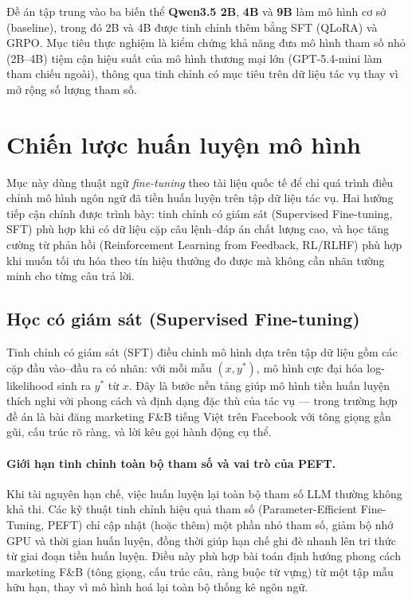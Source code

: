 Đề án tập trung vào ba biến thể \textbf{Qwen3.5 2B}, \textbf{4B} và
\textbf{9B} làm mô hình cơ sở (baseline), trong đó 2B và 4B được tinh
chỉnh thêm bằng SFT (QLoRA) và GRPO. Mục tiêu thực nghiệm là kiểm chứng
khả năng đưa mô hình tham số nhỏ (2B--4B) tiệm cận hiệu suất của mô hình
thương mại lớn (GPT-5.4-mini làm tham chiếu ngoài), thông qua tinh chỉnh
có mục tiêu trên dữ liệu tác vụ thay vì mở rộng số lượng tham số.

\section{Chiến lược huấn luyện mô hình}\label{sec:fine-tuning}

Mục này dùng thuật ngữ \textit{fine-tuning} theo tài liệu quốc tế để chỉ
quá trình điều chỉnh mô hình ngôn ngữ đã tiền huấn luyện trên tập dữ liệu
tác vụ. Hai hướng tiếp cận chính được trình bày: tinh chỉnh có giám sát
(Supervised Fine-tuning, SFT) phù hợp khi có dữ liệu cặp câu lệnh--đáp
án chất lượng cao, và học tăng cường từ phản hồi (Reinforcement Learning
from Feedback, RL/RLHF) phù hợp khi muốn tối ưu hóa theo tín hiệu thưởng
đo được mà không cần nhãn tường minh cho từng câu trả lời.

\subsection{Học có giám sát (Supervised Fine-tuning)}\label{subsec:sft}

Tinh chỉnh có giám sát (SFT) điều chỉnh mô hình dựa trên tập dữ liệu
gồm các cặp đầu vào--đầu ra có nhãn: với mỗi mẫu $(x, y^*)$, mô hình
cực đại hóa log-likelihood sinh ra $y^*$ từ $x$. Đây là bước nền tảng
giúp mô hình tiền huấn luyện thích nghi với phong cách và định dạng
đặc thù của tác vụ --- trong trường hợp đề án là bài đăng marketing
F\&B tiếng Việt trên Facebook với tông giọng gần gũi, cấu trúc rõ ràng,
và lời kêu gọi hành động cụ thể.

\paragraph{Giới hạn tinh chỉnh toàn bộ tham số và vai trò của PEFT.}
Khi tài nguyên hạn chế, việc huấn luyện lại toàn bộ tham số LLM
thường không khả thi. Các kỹ thuật tinh chỉnh hiệu quả tham
số (Parameter-Efficient Fine-Tuning, PEFT) chỉ cập nhật (hoặc thêm)
một phần nhỏ tham số, giảm bộ nhớ GPU và thời gian huấn luyện, đồng
thời giúp hạn chế ghi đè nhanh lên tri thức từ giai đoạn tiền huấn
luyện. Điều này phù hợp bài toán định hướng phong cách marketing F\&B
(tông giọng, cấu trúc câu, ràng buộc từ vựng) từ một tập mẫu hữu
hạn, thay vì mô hình hoá lại toàn bộ thống kê ngôn ngữ.


